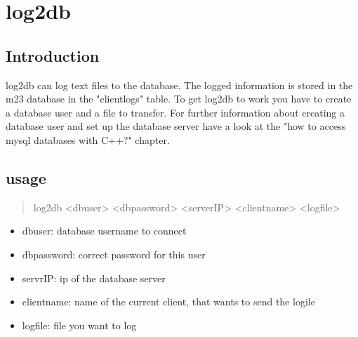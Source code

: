 \section{log2db}
\subsection{Introduction}
log2db can log text files to the database. The logged information is stored in the m23 database in the "clientlogs" table. To get log2db to work you have to create a database user and a file to transfer. For further information about creating a database user and set up the database server have a look at the "how to access mysql databases with C++?" chapter.
\subsection{usage}
\begin{quotation}
log2db <dbuser> <dbpassword> <serverIP> <clientname> <logfile>
\end{quotation}
\begin{itemize}
\item dbuser: database username to connect
\item dbpassword: correct password for this user
\item servrIP: ip of the database server
\item clientname: name of the current client, that wants to send the logile
\item logfile: file you want to log
\end{itemize} 


        

